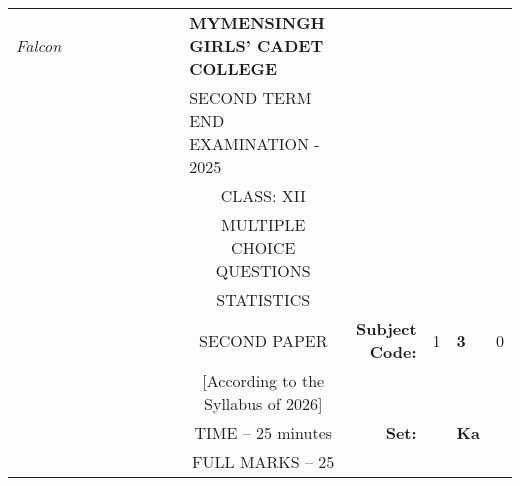 \documentclass[12pt]{exam}
\begin{document}
\begin{table}[]
\begin{tabular}{llllllllcllll}
\textit{Falcon} &  &  &  &  &  &  &  & \multicolumn{1}{l}{\textbf{MYMENSINGH GIRLS' CADET COLLEGE}} &                                             &                        &                                 &                        \\
                &  &  &  &  &  &  &  & \multicolumn{1}{l}{SECOND TERM END EXAMINATION - 2025}       &                                             &                        & \multicolumn{1}{c}{}            &                        \\
                &  &  &  &  &  &  &  & CLASS: XII                                                   &                                             &                        & \multicolumn{1}{c}{}            &                        \\
                &  &  &  &  &  &  &  & MULTIPLE CHOICE QUESTIONS                                    &                                             &                        & \multicolumn{1}{c}{}            &                        \\
                &  &  &  &  &  &  &  & STATISTICS                                                   &                                             &                        & \multicolumn{1}{r}{}            &                        \\ \cline{11-13} 
                &  &  &  &  &  &  &  & SECOND PAPER                                                 & \multicolumn{1}{r|}{\textbf{Subject Code:}} & \multicolumn{1}{l|}{1} & \multicolumn{1}{l|}{\textbf{3}} & \multicolumn{1}{l|}{0} \\ \cline{11-13} 
                &  &  &  &  &  &  &  & [According to the Syllabus of 2026]                          & \multicolumn{1}{r}{}                        &                        &                                 &                        \\ \cline{12-12}
                &  &  &  &  &  &  &  & TIME – 25 minutes                                            & \multicolumn{1}{r}{\textbf{Set:}}           & \multicolumn{1}{l|}{}  & \multicolumn{1}{l|}{\textbf{Ka}} &                        \\ \cline{12-12}
                &  &  &  &  &  &  &  & FULL MARKS – 25                                              &                                             &                        &                                 &                       
\end{tabular}
\end{table}
\end{document}

